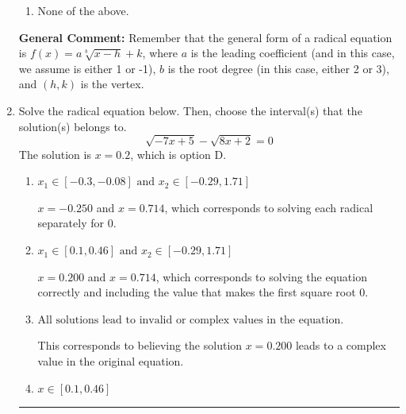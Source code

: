 \documentclass{extbook}[14pt]
\newcommand{\litem}[1]{\item #1

\rule{\textwidth}{0.4pt}}
\begin{document}
\begin{enumerate}
{\begin{enumerate}[label=\Alph*.]
\item None of the above.\end{enumerate}
\textbf{General Comment:} Remember that the general form of a radical equation is $ f(x) = a \sqrt[b]{x - h} + k $, where $a$ is the leading coefficient (and in this case, we assume is either 1 or -1), $b$ is the root degree (in this case, either 2 or 3), and $(h, k)$ is the vertex.
}
\litem{
Solve the radical equation below. Then, choose the interval(s) that the solution(s) belongs to.
\[ \sqrt{-7 x + 5} - \sqrt{8 x + 2} = 0 \]The solution is \( x = 0.2 \), which is option D.\begin{enumerate}[label=\Alph*.]
\item \( x_1 \in [-0.3, -0.08] \text{ and } x_2 \in [-0.29,1.71] \)

$x = -0.250$ and $x = 0.714$, which corresponds to solving each radical separately for 0.
\item \( x_1 \in [0.1, 0.46] \text{ and } x_2 \in [-0.29,1.71] \)

$x = 0.200$ and $x = 0.714$, which corresponds to solving the equation correctly and including the value that makes the first square root 0.
\item \( \text{All solutions lead to invalid or complex values in the equation.} \)

This corresponds to believing the solution $x = 0.200$ leads to a complex value in the original equation.
\item \( x \in [0.1,0.46] \)


\end{enumerate}}
\end{enumerate}
\end{document}
